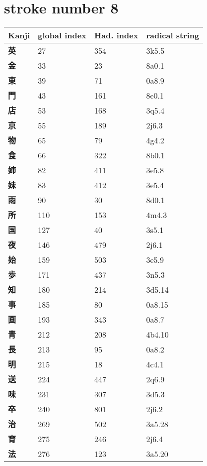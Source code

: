 \section{stroke number 8}
  \begin{longtable}[c]{llll}
    \bfseries Kanji & \bfseries global index & \bfseries Had. index & \bfseries radical string\\\hline\endhead
    \bfseries 英 & 27 & 354 & 3k5.5\\
    \bfseries 金 & 33 & 23 & 8a0.1\\
    \bfseries 東 & 39 & 71 & 0a8.9\\
    \bfseries 門 & 43 & 161 & 8e0.1\\
    \bfseries 店 & 53 & 168 & 3q5.4\\
    \bfseries 京 & 55 & 189 & 2j6.3\\
    \bfseries 物 & 65 & 79 & 4g4.2\\
    \bfseries 食 & 66 & 322 & 8b0.1\\
    \bfseries 姉 & 82 & 411 & 3e5.8\\
    \bfseries 妹 & 83 & 412 & 3e5.4\\
    \bfseries 雨 & 90 & 30 & 8d0.1\\
    \bfseries 所 & 110 & 153 & 4m4.3\\
    \bfseries 国 & 127 & 40 & 3s5.1\\
    \bfseries 夜 & 146 & 479 & 2j6.1\\
    \bfseries 始 & 159 & 503 & 3e5.9\\
    \bfseries 歩 & 171 & 437 & 3n5.3\\
    \bfseries 知 & 180 & 214 & 3d5.14\\
    \bfseries 事 & 185 & 80 & 0a8.15\\
    \bfseries 画 & 193 & 343 & 0a8.7\\
    \bfseries 青 & 212 & 208 & 4b4.10\\
    \bfseries 長 & 213 & 95 & 0a8.2\\
    \bfseries 明 & 215 & 18 & 4c4.1\\
    \bfseries 送 & 224 & 447 & 2q6.9\\
    \bfseries 味 & 231 & 307 & 3d5.3\\
    \bfseries 卒 & 240 & 801 & 2j6.2\\
    \bfseries 治 & 269 & 502 & 3a5.28\\
    \bfseries 育 & 275 & 246 & 2j6.4\\
    \bfseries 法 & 276 & 123 & 3a5.20\\

\end{longtable}
